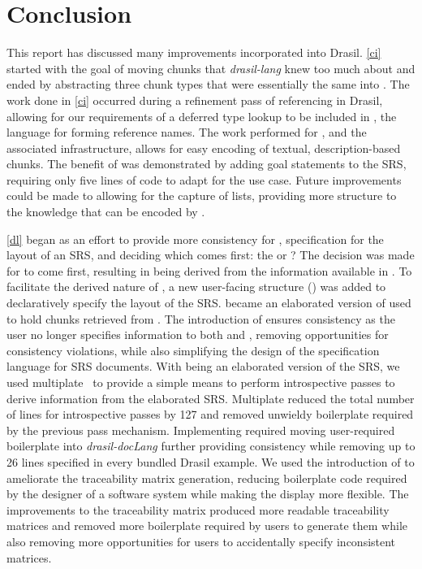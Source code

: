 \chapter{Conclusion}\label{conclusion}
This report has discussed many improvements incorporated into Drasil. \autoref{ci} started with the goal of moving chunks that \textit{drasil-lang} knew too much about and ended by abstracting three chunk types that were essentially the same into . The work done in \autoref{ci} occurred during a refinement pass of referencing in Drasil, allowing for our requirements of a deferred type lookup to be included in , the language for forming reference names. The work performed for , and the associated infrastructure, allows for easy encoding of textual, description-based chunks. The benefit of  was demonstrated by adding goal statements to the SRS, requiring only five lines of code to adapt  for the use case. Future improvements could be made to  allowing for the capture of lists, providing more structure to the knowledge that can be encoded by . 

\autoref{dl} began as an effort to provide more consistency for , specification for the layout of an SRS, and deciding which comes first: the  or ? The decision was made for  to come first, resulting in  being derived from the information available in . To facilitate the derived nature of , a new user-facing structure () was added to declaratively specify the layout of the SRS.  became an elaborated version of  used to hold chunks retrieved from . The introduction of  ensures consistency as the user no longer specifies information to both  and , removing opportunities for consistency violations, while also simplifying the design of the specification language for SRS documents. With  being an elaborated version of the SRS, we used multiplate~\cite{multiplate} to provide a simple means to perform introspective passes to derive information from the elaborated SRS. Multiplate reduced the total number of lines for introspective passes by 127 and removed unwieldy boilerplate required by the previous pass mechanism. Implementing  required moving user-required boilerplate into \textit{drasil-docLang} further providing consistency while removing up to 26 lines specified in every bundled Drasil example. We used the introduction of  to ameliorate the traceability matrix generation, reducing boilerplate code required by the designer of a software system while making the display more flexible. The improvements to the traceability matrix produced more readable traceability matrices and removed more boilerplate required by users to generate them while also removing more opportunities for users to accidentally specify inconsistent matrices.

